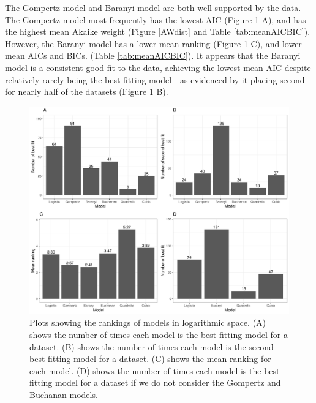 \documentclass[11pt, a4paper]{article}
\begin{document}
\begin{linenumbers}
The Gompertz model and Baranyi model are both well supported by the data. The Gompertz model most frequently has the lowest AIC (Figure \ref{fig:bestbars} A), and has the highest mean Akaike weight (Figure \ref{AWdist} and Table \ref{tab:meanAICBIC}). However, the Baranyi model has a lower mean ranking (Figure \ref{fig:bestbars} C), and lower mean AICs and BICs. (Table \ref{tab:meanAICBIC}). It appears that the Baranyi model is a consistent good fit to the data, achieving the lowest mean AIC despite relatively rarely being the best fitting model - as evidenced by it placing second for nearly half of the datasets (Figure \ref{fig:bestbars} B).



        \begin{figure}[H]
        \includegraphics[width=\linewidth]{../results/best_fit_frequency_bar.pdf}
        \caption{Plots showing the rankings of models in logarithmic space. (A) shows the number of times each model is the best fitting model for a dataset. (B) shows the number of times each model is the second best fitting model for a dataset. (C) shows the mean ranking for each model. (D) shows the number of times each model is the best fitting model for a dataset if we do not consider the Gompertz and Buchanan models. }
        \label{fig:bestbars}
        \end{figure}
        

\end{linenumbers}
\end{document}

